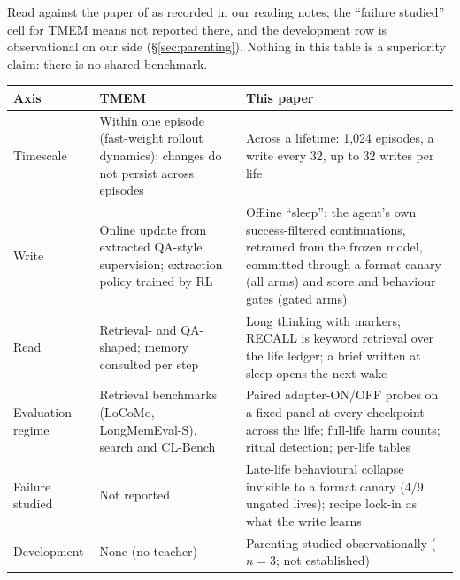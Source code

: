 \documentclass{article}
\begin{document}
Read against the paper of \citet{ren2026tmem} as recorded in our reading notes; the ``failure studied'' cell for TMEM means not reported there, and the development row is observational on our side (\S\ref{sec:parenting}). Nothing in this table is a superiority claim: there is no shared benchmark.
\begin{center}\footnotesize
\begin{tabular}{p{2.4cm}p{5.6cm}p{6.2cm}}
\toprule
Axis & TMEM & This paper \\
\midrule
Timescale & Within one episode (fast-weight rollout dynamics); changes do not persist across episodes & Across a lifetime: 1{,}024 episodes, a write every 32, up to 32 writes per life \\
Write & Online update from extracted QA-style supervision; extraction policy trained by RL & Offline ``sleep'': the agent's own success-filtered continuations, retrained from the frozen model, committed through a format canary (all arms) and score and behaviour gates (gated arms) \\
Read & Retrieval- and QA-shaped; memory consulted per step & Long thinking with markers; RECALL is keyword retrieval over the life ledger; a brief written at sleep opens the next wake \\
Evaluation regime & Retrieval benchmarks (LoCoMo, LongMemEval-S), search and CL-Bench & Paired adapter-ON/OFF probes on a fixed panel at every checkpoint across the life; full-life harm counts; ritual detection; per-life tables \\
Failure studied & Not reported & Late-life behavioural collapse invisible to a format canary (4/9 ungated lives); recipe lock-in as what the write learns \\
Development & None (no teacher) & Parenting studied observationally ($n = 3$; not established) \\
\bottomrule
\end{tabular}
\end{center}
\end{document}
